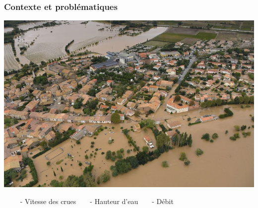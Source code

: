 \begin{frame}
	\frametitle{Contexte et problématiques}
	\vspace{0.25cm}
	\begin{center}
		\includegraphics[scale=0.35]{images/inondations.png}
	\end{center}
	\begin{block}{}
		\large ~~~~ - Vitesse des crues~~~~- Hauteur d'eau~~~~- Débit
	\end{block}
\end{frame}



